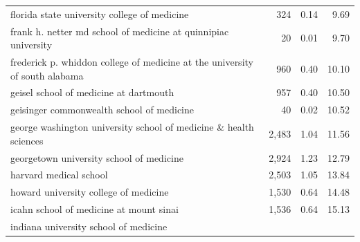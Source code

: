 \begin{table}[!h]
\begin{tabular}{llll}
\multicolumn{1}{l}{\hspace{1em}florida state university college of medicine} &
  \multicolumn{1}{r}{324} &
  \multicolumn{1}{r}{0.14} &
  \multicolumn{1}{r}{9.69} \\
\multicolumn{1}{l}{\hspace{1em}frank h. netter md school of medicine at quinnipiac university} &
  \multicolumn{1}{r}{20} &
  \multicolumn{1}{r}{0.01} &
  \multicolumn{1}{r}{9.70} \\
\multicolumn{1}{l}{\hspace{1em}frederick p. whiddon college of medicine at the university of south alabama} &
  \multicolumn{1}{r}{960} &
  \multicolumn{1}{r}{0.40} &
  \multicolumn{1}{r}{10.10} \\
\multicolumn{1}{l}{\hspace{1em}geisel school of medicine at dartmouth} &
  \multicolumn{1}{r}{957} &
  \multicolumn{1}{r}{0.40} &
  \multicolumn{1}{r}{10.50} \\
\multicolumn{1}{l}{\hspace{1em}geisinger commonwealth school of medicine} &
  \multicolumn{1}{r}{40} &
  \multicolumn{1}{r}{0.02} &
  \multicolumn{1}{r}{10.52} \\
\multicolumn{1}{l}{\hspace{1em}george washington university school of medicine \& health sciences} &
  \multicolumn{1}{r}{2,483} &
  \multicolumn{1}{r}{1.04} &
  \multicolumn{1}{r}{11.56} \\
\multicolumn{1}{l}{\hspace{1em}georgetown university school of medicine} &
  \multicolumn{1}{r}{2,924} &
  \multicolumn{1}{r}{1.23} &
  \multicolumn{1}{r}{12.79} \\
\multicolumn{1}{l}{\hspace{1em}harvard medical school} &
  \multicolumn{1}{r}{2,503} &
  \multicolumn{1}{r}{1.05} &
  \multicolumn{1}{r}{13.84} \\
\multicolumn{1}{l}{\hspace{1em}howard university college of medicine} &
  \multicolumn{1}{r}{1,530} &
  \multicolumn{1}{r}{0.64} &
  \multicolumn{1}{r}{14.48} \\
\multicolumn{1}{l}{\hspace{1em}icahn school of medicine at mount sinai} &
  \multicolumn{1}{r}{1,536} &
  \multicolumn{1}{r}{0.64} &
  \multicolumn{1}{r}{15.13} \\
\multicolumn{1}{l}{\hspace{1em}indiana university school of medicine} &

\end{tabular}
\end{table}
